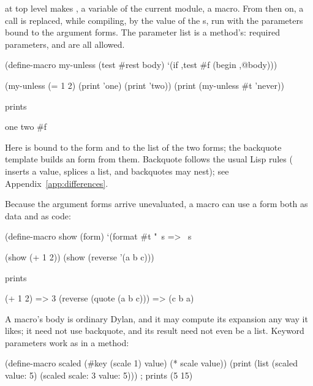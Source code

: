 \begin{quote}
\end{quote}

\noindent at top level makes , a variable of the current
module, a macro. From then on, a call  is replaced, while compiling, by the value of the
s, run with the parameters bound to the argument forms. The
parameter list is a method's: required parameters,  and
 are all allowed.

\begin{dylan}
(define-macro my-unless (test #rest body)
  `(if ,test #f (begin ,@body)))

(my-unless (= 1 2)
  (print 'one)
  (print 'two))
(print (my-unless #t 'never))
\end{dylan}

\noindent prints

\begin{dylan}
one
two
#f
\end{dylan}

Here  is bound to the form  and  to
the list of the two  forms; the backquote template builds an
 form from them. Backquote follows the usual Lisp rules
(\code{,} inserts a value,  splices a list, and backquotes may
nest); see Appendix~\ref{app:differences}.

Because the argument forms arrive unevaluated, a macro can use a form
both as data and as code:

\begin{dylan}
(define-macro show (form)
  `(format #t "~s => ~s~%

(show (+ 1 2))
(show (reverse '(a b c)))
\end{dylan}

\noindent prints

\begin{dylan}
(+ 1 2) => 3
(reverse (quote (a b c))) => (c b a)
\end{dylan}

A macro's body is ordinary Dylan, and it may compute its expansion any
way it likes; it need not use backquote, and its result need not even be
a list. Keyword parameters work as in a method:

\begin{dylan}
(define-macro scaled (#key (scale 1) value)
  (* scale value))
(print (list (scaled value: 5) (scaled scale: 3 value: 5)))
; prints (5 15)
\end{dylan}

